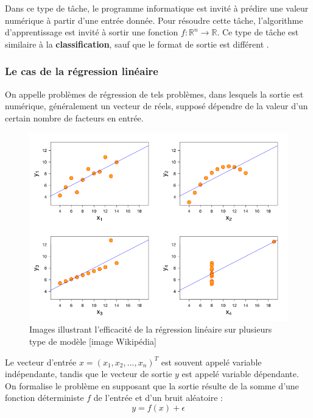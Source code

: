 	Dans ce type de tâche, le programme informatique est invité à prédire une valeur numérique à partir d'une entrée donnée. Pour résoudre cette tâche, l'algorithme d'apprentissage est invité à sortir une fonction $f : \mathbb{R}^n \rightarrow \mathbb{R}$. Ce type de tâche est similaire à la \textbf{classification}, sauf que le format de sortie est différent \cite{goodfellow2016deep}.
	
	
	
	
	\subsubsection{Le cas de la régression linéaire}
		On appelle problèmes de régression de tels problèmes, dans lesquels la sortie est numérique, généralement un vecteur de réels, supposé dépendre de la valeur d'un certain nombre de facteurs en entrée\cite{matloff2017statistical}.
		
		\begin{figure}[hth]%
			\centering
			\includegraphics[width=\textwidth]{images/linear_regression_quartet.png}
			\caption{Images illustrant l'efficacité de la régression linéaire sur plusieurs type de modèle [image Wikipédia]
			}
			\label{fig:linear_regression_quartet}
		\end{figure}
		
		Le vecteur d'entrée $x = (x_1,x_2,...,x_n)^T$ est souvent appelé variable indépendante, tandis que le vecteur de sortie $y$ est appelé variable dépendante. On formalise le problème en supposant que la sortie résulte de la somme d'une fonction déterministe $f$ de l'entrée et d'un bruit aléatoire :
		\begin{equation}
			y = f(x) + \epsilon
		\end{equation}
	
